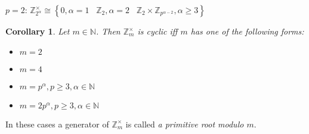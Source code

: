 \documentclass[a4paper]{article}
\newtheorem{cor}{Corollary}
\newcommand{\N}{\mathbb{N}}
\newcommand{\Z}{\mathbb{Z}}
\newcommand{\set}[1]{\left\{#1\right\}}
\begin{document}
$p = 2$: $\Z_{2^\alpha}^\times \cong \set{0, \alpha = 1 \hspace{10pt} \Z_2, \alpha = 2 \hspace{10pt} \Z_2 \times \Z_{p^{\alpha -2}}, \alpha \geq 3}$

\begin{cor}
  Let $m \in \N$. Then $\Z_m^\times$ is cyclic iff $m$ has one of the following forms:
  \begin{itemize}
    \item $m = 2$
    \item $m = 4$
    \item $m = p^\alpha, p \geq 3, \alpha \in \N$
    \item $m = 2 p^\alpha, p \geq 3, \alpha \in \N$
  \end{itemize}
\end{cor}

In these cases a generator of $\Z_m^\times$ is called \emph{a primitive root modulo $m$}.
\end{document}
